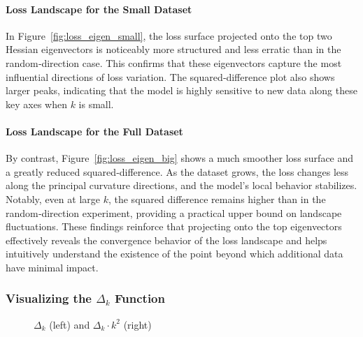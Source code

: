\documentclass{article}
\begin{document}
\paragraph{Loss Landscape for the Small Dataset}
In Figure~\ref{fig:loss_eigen_small}, the loss surface projected onto the top two Hessian eigenvectors is
noticeably more structured and less erratic than in the random‐direction case. This confirms that these eigenvectors capture the
most influential directions of loss variation. The squared‐difference plot also shows larger peaks, indicating that the model is
highly sensitive to new data along these key axes when $k$ is small.

\paragraph{Loss Landscape for the Full Dataset}
By contrast, Figure~\ref{fig:loss_eigen_big} shows a much smoother loss surface and a greatly reduced squared‐difference.
As the dataset grows, the loss changes less along the principal curvature directions, and the model’s local behavior stabilizes.
Notably, even at large $k$, the squared difference remains higher than in the random‐direction experiment, providing a practical upper
bound on landscape fluctuations. These findings reinforce that projecting onto the top eigenvectors effectively reveals the convergence
behavior of the loss landscape and helps intuitively understand the existence of the point beyond which additional data have minimal impact.

\subsubsection{Visualizing the \texorpdfstring{$\Delta_k$}{Delta k} Function}

\begin{figure}[!htbp]
  \hspace*{-2.6cm}
  \caption{$\Delta_k$ (left) and $\Delta_k \cdot k^2$ (right)}
  \label{fig:delta_eigen}
\end{figure}
\end{document}
